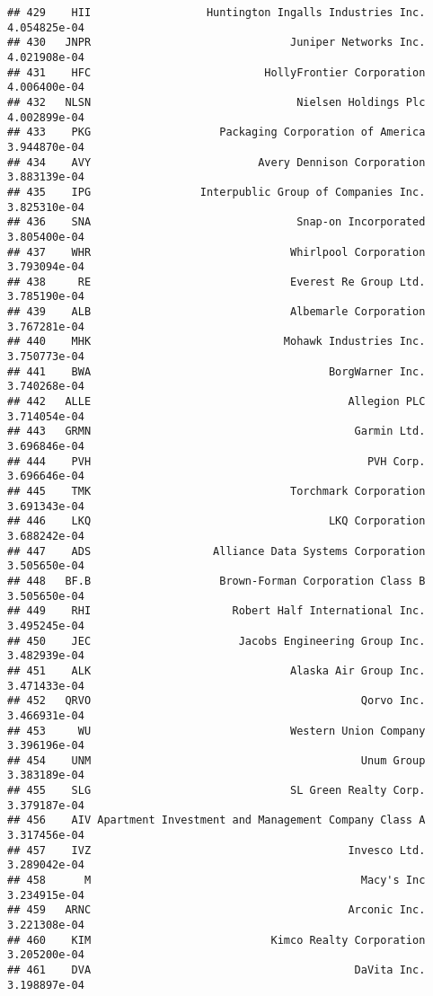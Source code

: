 \documentclass[
]{article}
\begin{document}
\begin{verbatim}
## 429    HII                  Huntington Ingalls Industries Inc. 4.054825e-04
## 430   JNPR                               Juniper Networks Inc. 4.021908e-04
## 431    HFC                           HollyFrontier Corporation 4.006400e-04
## 432   NLSN                                Nielsen Holdings Plc 4.002899e-04
## 433    PKG                    Packaging Corporation of America 3.944870e-04
## 434    AVY                          Avery Dennison Corporation 3.883139e-04
## 435    IPG                 Interpublic Group of Companies Inc. 3.825310e-04
## 436    SNA                                Snap-on Incorporated 3.805400e-04
## 437    WHR                               Whirlpool Corporation 3.793094e-04
## 438     RE                               Everest Re Group Ltd. 3.785190e-04
## 439    ALB                               Albemarle Corporation 3.767281e-04
## 440    MHK                              Mohawk Industries Inc. 3.750773e-04
## 441    BWA                                     BorgWarner Inc. 3.740268e-04
## 442   ALLE                                        Allegion PLC 3.714054e-04
## 443   GRMN                                         Garmin Ltd. 3.696846e-04
## 444    PVH                                           PVH Corp. 3.696646e-04
## 445    TMK                               Torchmark Corporation 3.691343e-04
## 446    LKQ                                     LKQ Corporation 3.688242e-04
## 447    ADS                   Alliance Data Systems Corporation 3.505650e-04
## 448   BF.B                    Brown-Forman Corporation Class B 3.505650e-04
## 449    RHI                      Robert Half International Inc. 3.495245e-04
## 450    JEC                       Jacobs Engineering Group Inc. 3.482939e-04
## 451    ALK                               Alaska Air Group Inc. 3.471433e-04
## 452   QRVO                                          Qorvo Inc. 3.466931e-04
## 453     WU                               Western Union Company 3.396196e-04
## 454    UNM                                          Unum Group 3.383189e-04
## 455    SLG                               SL Green Realty Corp. 3.379187e-04
## 456    AIV Apartment Investment and Management Company Class A 3.317456e-04
## 457    IVZ                                        Invesco Ltd. 3.289042e-04
## 458      M                                          Macy's Inc 3.234915e-04
## 459   ARNC                                        Arconic Inc. 3.221308e-04
## 460    KIM                            Kimco Realty Corporation 3.205200e-04
## 461    DVA                                         DaVita Inc. 3.198897e-04

\end{verbatim}
\end{document}
